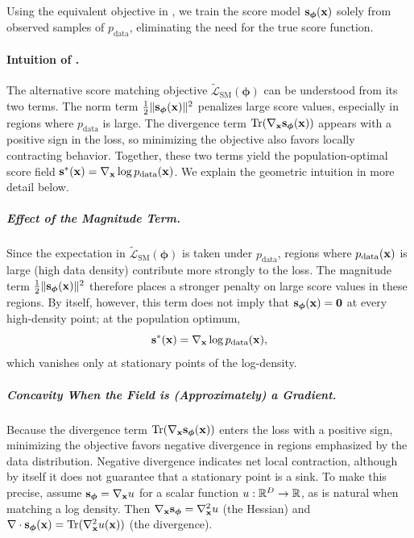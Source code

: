 Using the equivalent objective in , we train the score model ${\mathbf{s}}_{\bm{\phi}}({\mathbf{x}})$ solely from observed samples of $p_{\mathrm{data}}$, eliminating the need for the true score function.


\paragraph{Intuition of .}
The alternative score matching objective $\widetilde{\mathcal{L}}_{\text{SM}}(\bm\phi)$
can be understood from its two terms.
The norm term $\tfrac12\|{\mathbf{s}}_{\bm\phi}({\mathbf{x}})\|^2$ penalizes large score values,
especially in regions where $p_{\mathrm{data}}$ is large.
The divergence term $\operatorname{Tr}(\nabla_{{\mathbf{x}}} {\mathbf{s}}_{\bm\phi}({\mathbf{x}}))$ appears with a positive sign in the loss, so minimizing the objective also favors locally contracting behavior.
Together, these two terms yield the population-optimal score field
${\mathbf{s}}^*({\mathbf{x}})=\nabla_{{\mathbf{x}}}\log p_{\mathrm{data}}({\mathbf{x}})$.
We explain the geometric intuition in more detail below.

\subparagraph{Effect of the Magnitude Term.}
Since the expectation in $\widetilde{\mathcal{L}}_{\mathrm{SM}}(\bm\phi)$ is taken under
$p_{\mathrm{data}}$, regions where $p_{\mathrm{data}}({\mathbf{x}})$ is large (high data density)
contribute more strongly to the loss. The magnitude term
$\tfrac12\|{\mathbf{s}}_{\bm\phi}({\mathbf{x}})\|^2$ therefore places a stronger penalty on large
score values in these regions. By itself, however, this term does not imply that
${\mathbf{s}}_{\bm\phi}({\mathbf{x}})=\mathbf{0}$ at every high-density point; at the population
optimum,
\[
{\mathbf{s}}^*({\mathbf{x}})=\nabla_{{\mathbf{x}}}\log p_{\mathrm{data}}({\mathbf{x}}),
\]
which vanishes only at stationary points of the log-density.

\subparagraph{Concavity When the Field is (Approximately) a Gradient.}
Because the divergence term $\operatorname{Tr}(\nabla_{{\mathbf{x}}} {\mathbf{s}}_{\bm\phi}({\mathbf{x}}))$ enters the loss with a positive sign, minimizing the objective favors
negative divergence in regions emphasized by the data distribution.
Negative divergence indicates net local contraction, although by itself it does
not guarantee that a stationary point is a sink.
To make this precise, assume
${\mathbf{s}}_{\bm\phi}=\nabla_{{\mathbf{x}}}u$ for a scalar function $u:\mathbb{R}^D\to\mathbb{R}$, as is natural when matching a
log density. Then $\nabla_{{\mathbf{x}}}{\mathbf{s}}_{\bm\phi}=\nabla_{{\mathbf{x}}}^2 u$ (the Hessian) and
$\nabla \cdot {\mathbf{s}}_{\bm\phi}({\mathbf{x}})=\operatorname{Tr}(\nabla_{{\mathbf{x}}}^2 u({\mathbf{x}}))$ (the divergence).

